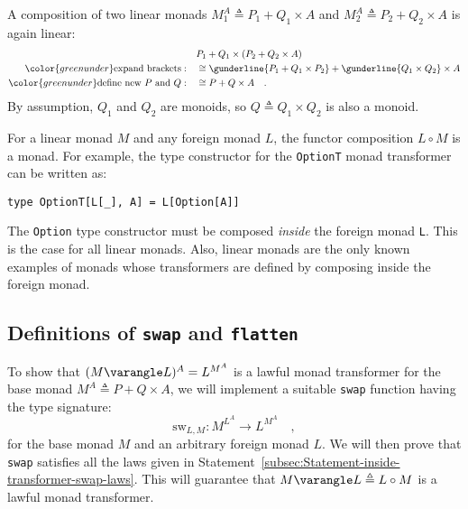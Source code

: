 A composition of two linear monads $M_{1}^{A}\triangleq P_{1}+Q_{1}\times A$
and $M_{2}^{A}\triangleq P_{2}+Q_{2}\times A$ is again linear:
\begin{align*}
 & P_{1}+Q_{1}\times\left(P_{2}+Q_{2}\times A\right)\\
{\color{greenunder}\text{expand brackets}:}\quad & \cong\gunderline{P_{1}+Q_{1}\times P_{2}}+\gunderline{Q_{1}\times Q_{2}}\times A\\
{\color{greenunder}\text{define new }P\text{ and }Q:}\quad & \cong P+Q\times A\quad.
\end{align*}
By assumption, $Q_{1}$ and $Q_{2}$ are monoids, so $Q\triangleq Q_{1}\times Q_{2}$
is also a monoid.

For a linear monad $M$ and any foreign monad $L$, the functor composition
$L\circ M$ is a monad. For example, the type constructor for the
\lstinline!OptionT! monad transformer can be written as:
\begin{lstlisting}
type OptionT[L[_], A] = L[Option[A]]
\end{lstlisting}
The \lstinline!Option! type constructor must be composed \emph{inside}
the foreign monad \lstinline!L!. This is the case for all linear
monads. Also, linear monads are the only known examples of monads
whose transformers are defined by composing inside the foreign monad.

\subsection{Definitions of \texttt{swap} and \texttt{flatten}}

To show that $(M\varangle L)^{A}=L^{M^{A}}$ is a lawful monad transformer
for the base monad $M^{A}\triangleq P+Q\times A$, we will implement
a suitable \lstinline!swap! function having the type signature:
\[
\text{sw}_{L,M}:M^{L^{A}}\rightarrow L^{M^{A}}\quad,
\]
for the base monad $M$ and an arbitrary foreign monad $L$. We will
then prove that \lstinline!swap! satisfies all the laws given in
Statement~\ref{subsec:Statement-inside-transformer-swap-laws}. This
will guarantee that $M\varangle L\triangleq L\circ M$ is a lawful
monad transformer.

